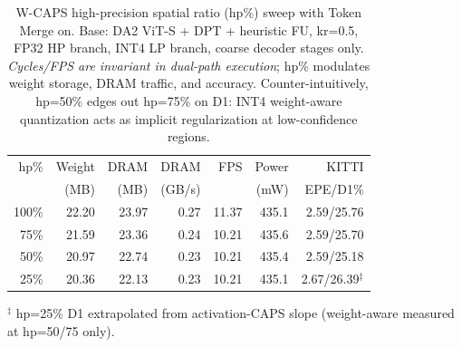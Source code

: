 \begin{table}[t]
\caption{W-CAPS high-precision spatial ratio (hp\%) sweep with Token Merge on. Base: DA2 ViT-S + DPT + heuristic FU, kr=0.5, FP32 HP branch, INT4 LP branch, coarse decoder stages only. \emph{Cycles/FPS are invariant in dual-path execution}; hp\% modulates weight storage, DRAM traffic, and accuracy. Counter-intuitively, hp=50\% edges out hp=75\% on D1: INT4 weight-aware quantization acts as implicit regularization at low-confidence regions.}
\label{tab:hp_sweep}
\centering
\footnotesize
\begin{tabular}{@{}rrrrrrr@{}}
\toprule
hp\% & Weight & DRAM & DRAM & FPS & Power & KITTI \\
     & (MB)   & (MB) & (GB/s) &   & (mW)  & EPE/D1\% \\
\midrule
100\% & 22.20 & 23.97 & 0.27  & 11.37 & 435.1  & 2.59/25.76 \\
75\% & 21.59 & 23.36 & 0.24  & 10.21 & 435.6  & 2.59/25.70 \\
50\% & 20.97 & 22.74 & 0.23  & 10.21 & 435.4  & 2.59/25.18 \\
25\% & 20.36 & 22.13 & 0.23  & 10.21 & 435.1  & 2.67/26.39$^\ddagger$ \\
\bottomrule
\end{tabular}
\begin{flushleft}\scriptsize
$^\ddagger$ hp=25\% D1 extrapolated from activation-CAPS slope (weight-aware measured at hp=50/75 only).
\end{flushleft}
\end{table}